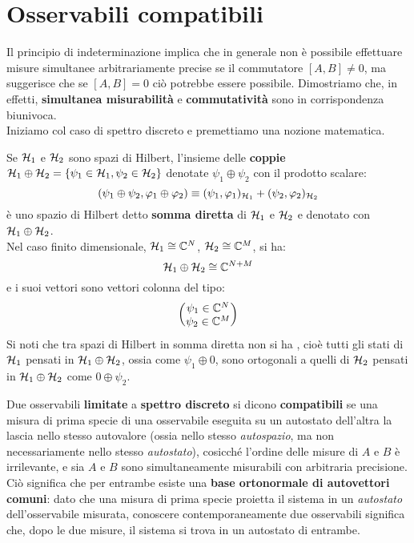 \documentclass[../../FisicaTeorica.tex]{subfiles}
\begin{document}
\section{Osservabili compatibili}
Il principio di indeterminazione implica che in generale non è possibile effettuare misure simultanee arbitrariamente precise se il commutatore $[A,B]\neq 0$, ma suggerisce che se $[A,B]=0$ ciò potrebbe essere possibile. Dimostriamo che, in effetti, \textbf{simultanea misurabilità} e \textbf{commutatività} sono in corrispondenza biunivoca.\\
Iniziamo col caso di spettro discreto e premettiamo una nozione matematica.\\
\begin{dfn}
Se $\mathcal{H}_1$  e $\mathcal{H}_2$ sono spazi di Hilbert, l'insieme delle \textbf{coppie} $\mathcal{H}_1 \oplus \mathcal{H}_2 = \{\psi_1 \in \mathcal{H}_1, \psi_2 \in \mathcal{H}_2\}$ denotate $\psi_1 \oplus \psi_2$ con il prodotto scalare:
\[
(\psi_1 \oplus \psi_2, \varphi_1 \oplus \varphi_2)\equiv (\psi_1, \varphi_1)_{\mathcal{H}_1} + (\psi_2, \varphi_2)_{\mathcal{H}_2}
\] 
è uno spazio di Hilbert detto \textbf{somma diretta} di $\mathcal{H}_1$ e $\mathcal{H}_2$ e denotato con $\mathcal{H}_1 \oplus \mathcal{H}_2$.\\
Nel caso finito dimensionale, $\mathcal{H}_1 \cong \mathbb{C}^N$, $\mathcal{H}_2 \cong \mathbb{C}^M$, si ha:
\[
\mathcal{H}_1 \oplus \mathcal{H}_2 \cong \mathbb{C}^{N+M}
\]
e i suoi vettori sono vettori colonna del tipo:
\[
\begin{pmatrix}
\psi_1 \in \mathbb{C}^N\\
\psi_2 \in \mathbb{C}^M
\end{pmatrix}
\]
Si noti che tra spazi di Hilbert in somma diretta non si ha , cioè tutti gli stati di $\mathcal{H}_1$ pensati in $\mathcal{H}_1 \oplus \mathcal{H}_2$, ossia come $\psi_1 \oplus 0$, sono ortogonali a quelli di $\mathcal{H}_2$ pensati in $\mathcal{H}_1\oplus \mathcal{H}_2$ come $0\oplus \psi_2$.
\end{dfn}

\begin{dfn}
Due osservabili \textbf{limitate} a \textbf{spettro discreto} si dicono \textbf{compatibili} se una misura di prima specie di una osservabile eseguita su un autostato dell'altra la lascia nello stesso autovalore (ossia nello stesso \textit{autospazio}, ma non necessariamente nello stesso \textit{autostato}), cosicché l'ordine delle misure di $A$ e $B$ è irrilevante, e sia $A$ e $B$ sono simultaneamente misurabili con arbitraria precisione. Ciò significa che per entrambe esiste una \textbf{base ortonormale di autovettori comuni}: dato che una misura di prima specie proietta il sistema in un \textit{autostato} dell'osservabile misurata, conoscere contemporaneamente due osservabili significa che, dopo le due misure, il sistema si trova in un autostato di entrambe.  
\end{dfn}
\end{document}
